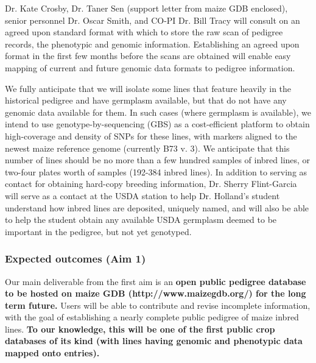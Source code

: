 \documentclass[12pt]{article}
\begin{document}
{Dr. Kate Crosby, Dr. Taner Sen (support letter from maize GDB enclosed), senior personnel Dr. Oscar Smith, and CO-PI Dr. Bill Tracy will consult on an agreed upon standard format with which to store the raw scan of pedigree records, the phenotypic and genomic information. 
Establishing an agreed upon format in the first few months before the scans are obtained will enable easy mapping of current and future genomic data formats to pedigree information.

We fully anticipate that we will isolate some lines that feature heavily in the historical pedigree and have germplasm available, but that do not have any genomic data available for them. 
In such cases (where germplasm is available), we intend to use genotype-by-sequencing (GBS) \citep{Elshire:2011ha} as a cost-efficient platform \citep{Glaubitz:2014eu} to obtain high-coverage and density of SNPs  for these lines, with markers aligned to the newest maize reference genome (currently B73 v. 3). We anticipate that this number of lines should be no more than a few hundred samples of inbred lines, or two-four plates worth of samples (192-384 inbred lines).
In addition to serving as contact for obtaining hard-copy breeding information, Dr. Sherry Flint-Garcia will serve as a contact at the USDA station to help Dr. Holland's student understand how inbred lines are deposited, uniquely named, and will also be able to help the student obtain any available USDA germplasm deemed to be important in the pedigree, but not yet genotyped.

\subsubsection*{Expected outcomes (Aim 1)}
Our main deliverable from the first aim is an \textbf{open public pedigree database to be hosted on maize GDB (http://www.maizegdb.org/) for the long term future.} Users will be able to contribute and revise incomplete information, with the goal of establishing a nearly complete public pedigree of maize inbred lines. \textbf{To our knowledge, this will be one of the first public crop databases of its kind (with lines having genomic and phenotypic data mapped onto entries).}  

}
\end{document}
